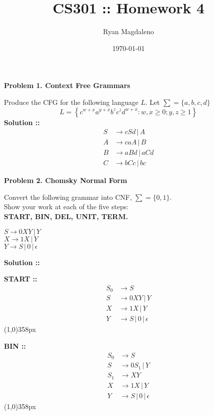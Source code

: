 \documentclass[11pt]{article}
\date{\today}
\title{CS301 :: Homework 4}
\author{Ryan Magdaleno}
\begin{document}
\maketitle


\textbf{Problem 1. Context Free Grammars}

Produce the CFG for the following language $L$. Let $\sum=\{a,b,c,d\}$
$$L = \left\{c^{w+x}a^{y+x}b^zc^zd^{w+x} : w, x\ge0;y,z\ge1\right\}$$
\vspace{5px}\textbf{Solution ::}
\begin{align}
    S&\longrightarrow cSd \,|\, A \\
    A&\longrightarrow caA \,|\, B \\
    B&\longrightarrow aBd \,|\, aCd \\
    C&\longrightarrow bCc \,|\, bc
\end{align}
\pagebreak


\textbf{Problem 2. Chomsky Normal Form} 

Convert the following grammar into CNF, $\sum = \{0,1\}.$ \\
Show your work at each of the five steps: \\
\textbf{START, BIN, DEL, UNIT, TERM.}

$S\longrightarrow 0XY \,|\, Y$ \\
$X\longrightarrow 1X \,|\, Y$ \\
$Y\longrightarrow S \,|\, 0 \,|\, \epsilon$

\vspace{5px}\textbf{Solution ::}

\textbf{START ::}
\begin{align}
    S_0&\longrightarrow S \\
    S&\longrightarrow 0XY \,|\, Y \\
    X&\longrightarrow 1X \,|\, Y \\
    Y&\longrightarrow S \,|\, 0 \,|\, \epsilon
\end{align}
\line(1,0){358px}

\textbf{BIN ::}
\begin{align}
    S_0&\longrightarrow S\\
    S&\longrightarrow 0S_1 \,|\, Y \\
    S_1&\longrightarrow XY\\
    X&\longrightarrow 1X \,|\, Y \\
    Y&\longrightarrow S \,|\, 0 \,|\, \epsilon
\end{align}
\line(1,0){358px}
\end{document}
